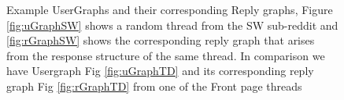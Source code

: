 \begin{figure}[!ht]
    \centering
    
    
    \caption{ Example UserGraphs and their corresponding Reply graphs, Figure \ref{fig:uGraphSW} shows a random thread from the SW sub-reddit and \ref{fig:rGraphSW} shows the corresponding reply graph that arises from the response structure of the same thread. In comparison we have Usergraph Fig \ref{fig:uGraphTD} and its corresponding reply graph Fig \ref{fig:rGraphTD} from one of the Front page threads }
    \label{Fig:GraphExamples}
\end{figure}



